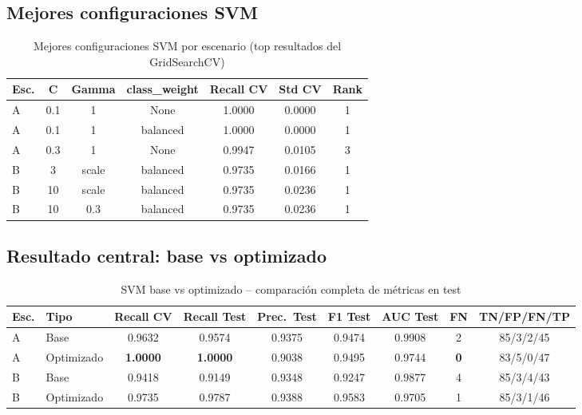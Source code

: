 \documentclass[11pt,a4paper]{article}
\begin{document}
\subsection{Mejores configuraciones SVM}

\begin{table}[H]
\centering
\caption{Mejores configuraciones SVM por escenario (top resultados del GridSearchCV)}
\renewcommand{\arraystretch}{1.1}
\begin{tabular}{lcccccc}
\toprule
\textbf{Esc.} & \textbf{C} & \textbf{Gamma} & \textbf{class\_weight} & \textbf{Recall CV} & \textbf{Std CV} & \textbf{Rank} \\
\midrule
A & 0.1 & 1 & None & 1.0000 & 0.0000 & 1 \\
A & 0.1 & 1 & balanced & 1.0000 & 0.0000 & 1 \\
A & 0.3 & 1 & None & 0.9947 & 0.0105 & 3 \\
\midrule
B & 3 & scale & balanced & 0.9735 & 0.0166 & 1 \\
B & 10 & scale & balanced & 0.9735 & 0.0236 & 1 \\
B & 10 & 0.3 & balanced & 0.9735 & 0.0236 & 1 \\
\bottomrule
\end{tabular}
\end{table}

\subsection{Resultado central: base vs optimizado}

\begin{table}[H]
\centering
\caption{SVM base vs optimizado -- comparación completa de métricas en test}
\renewcommand{\arraystretch}{1.2}
\begin{tabular}{llccccccc}
\toprule
\textbf{Esc.} & \textbf{Tipo} & \textbf{Recall CV} & \textbf{Recall Test} & \textbf{Prec.\ Test} & \textbf{F1 Test} & \textbf{AUC Test} & \textbf{FN} & \textbf{TN/FP/FN/TP} \\
\midrule
A & Base & 0.9632 & 0.9574 & 0.9375 & 0.9474 & 0.9908 & 2 & 85/3/2/45 \\
\rowcolor{bestrow}
A & Optimizado & \textbf{1.0000} & \textbf{1.0000} & 0.9038 & 0.9495 & 0.9744 & \textbf{0} & 83/5/0/47 \\
\midrule
B & Base & 0.9418 & 0.9149 & 0.9348 & 0.9247 & 0.9877 & 4 & 85/3/4/43 \\
\rowcolor{neutralrow}
B & Optimizado & 0.9735 & 0.9787 & 0.9388 & 0.9583 & 0.9705 & 1 & 85/3/1/46 \\
\bottomrule
\end{tabular}
\end{table}
\end{document}
